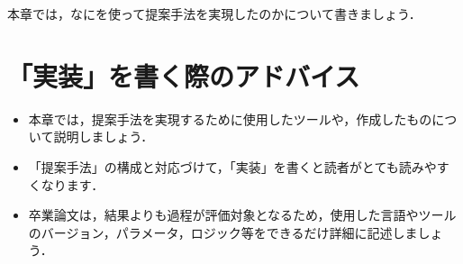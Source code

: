 本章では，なにを使って提案手法を実現したのかについて書きましょう．

\section{「実装」を書く際のアドバイス}
\begin{itemize}
    \item 本章では，提案手法を実現するために使用したツールや，作成したものについて説明しましょう．
    \item 「提案手法」の構成と対応づけて，「実装」を書くと読者がとても読みやすくなります．
    \item 卒業論文は，結果よりも過程が評価対象となるため，使用した言語やツールのバージョン，パラメータ，ロジック等をできるだけ詳細に記述しましょう．
\end{itemize}